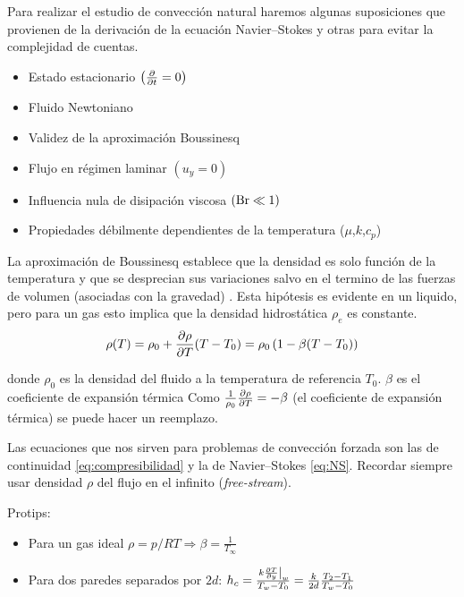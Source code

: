 Para realizar el estudio de convección natural haremos algunas suposiciones que provienen de la derivación de la ecuación Navier--Stokes y otras para evitar la complejidad de cuentas.
\begin{itemize}
    \item Estado estacionario $\left( \frac{\partial }{\partial t}=0\right)$
    \item Fluido Newtoniano 
    \item Validez de la  aproximación Boussinesq
    \item Flujo en régimen laminar $\left( u_y=0\right)$
    \item Influencia nula de disipación viscosa $\left(\textrm{Br} \ll 1\right)$
    \item Propiedades débilmente dependientes de la temperatura ($\mu$,$k$,$c_p$)
\end{itemize}

La aproximación de Boussinesq establece que la densidad es solo función de la temperatura y que se desprecian sus variaciones salvo en el termino de las fuerzas de volumen (asociadas con la gravedad) \citep{vieytes2018filminas}. Esta hipótesis es evidente en un liquido, pero para un gas esto implica que la densidad hidrostática $\rho_e$ es constante.
\begin{equation}\label{boussinesqdensity}
    \rho(T)=\rho_0+\frac{\partial \rho}{\partial T}(T-T_0)=\rho_0\left(1-\beta(T-T_0)\right)
\end{equation}

donde $\rho_0$ es la densidad del fluido a la temperatura de referencia $T_0$. $\beta$ es el coeficiente de expansión térmica Como $\frac{1}{\rho_0}\frac{\partial \rho}{\partial T}=-\beta$ (el coeficiente de expansión térmica) se puede hacer un reemplazo.

Las ecuaciones que nos sirven para problemas de convección forzada son las de continuidad \ref{eq:compresibilidad} y la de Navier--Stokes \ref{eq:NS}. Recordar siempre usar densidad $\rho$ del flujo en el infinito (\emph{free-stream}).

Protips:
\begin{itemize}
    \item Para un gas ideal $\rho=p/RT\Rightarrow \beta=\frac{1}{T_\infty}$
    \item Para dos paredes separados por $2d$: $h_c=\frac{\left. k\frac{\partial T}{\partial y}\right|_w}{T_w-T_0}=\frac{k}{2d}\frac{T_2-T_1}{T_w-T_0}$
\end{itemize}